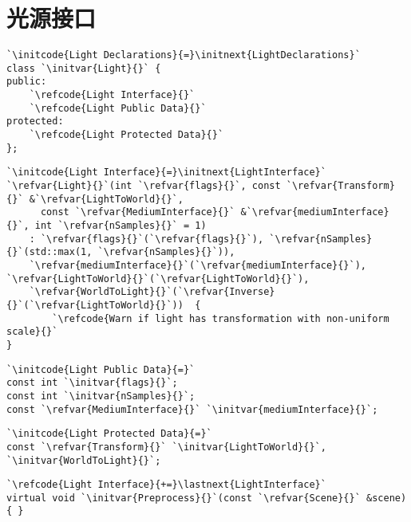 \section{光源接口}\label{sec:光源接口}

\begin{lstlisting}
`\initcode{Light Declarations}{=}\initnext{LightDeclarations}`
class `\initvar{Light}{}` {
public:
    `\refcode{Light Interface}{}`
    `\refcode{Light Public Data}{}`
protected:
    `\refcode{Light Protected Data}{}`
};
\end{lstlisting}

\begin{lstlisting}
`\initcode{Light Interface}{=}\initnext{LightInterface}`
`\refvar{Light}{}`(int `\refvar{flags}{}`, const `\refvar{Transform}{}` &`\refvar{LightToWorld}{}`,
      const `\refvar{MediumInterface}{}` &`\refvar{mediumInterface}{}`, int `\refvar{nSamples}{}` = 1)
    : `\refvar{flags}{}`(`\refvar{flags}{}`), `\refvar{nSamples}{}`(std::max(1, `\refvar{nSamples}{}`)),
    `\refvar{mediumInterface}{}`(`\refvar{mediumInterface}{}`), `\refvar{LightToWorld}{}`(`\refvar{LightToWorld}{}`),
    `\refvar{WorldToLight}{}`(`\refvar{Inverse}{}`(`\refvar{LightToWorld}{}`))  { 
        `\refcode{Warn if light has transformation with non-uniform scale}{}`
}
\end{lstlisting}

\begin{lstlisting}
`\initcode{Light Public Data}{=}`
const int `\initvar{flags}{}`;
const int `\initvar{nSamples}{}`;
const `\refvar{MediumInterface}{}` `\initvar{mediumInterface}{}`;
\end{lstlisting}

\begin{lstlisting}
`\initcode{Light Protected Data}{=}`
const `\refvar{Transform}{}` `\initvar{LightToWorld}{}`, `\initvar{WorldToLight}{}`;
\end{lstlisting}

\begin{lstlisting}
`\refcode{Light Interface}{+=}\lastnext{LightInterface}`
virtual void `\initvar{Preprocess}{}`(const `\refvar{Scene}{}` &scene) { }
\end{lstlisting}